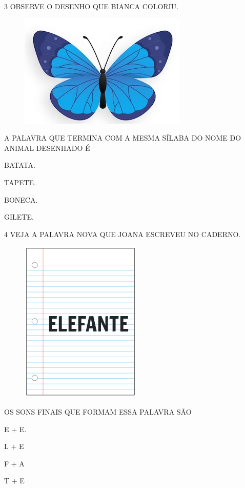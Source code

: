\num{3} OBSERVE O DESENHO QUE BIANCA COLORIU.

\begin{figure}[H]
\centering
\includegraphics[width=.45\textwidth]{media/image227.png}
\end{figure}


A PALAVRA QUE TERMINA COM A MESMA SÍLABA DO NOME DO ANIMAL DESENHADO É

\begin{escolha}
\item BATATA.

\item TAPETE.

\item BONECA.

\item GILETE.
\end{escolha}


\num{4} VEJA A PALAVRA NOVA QUE JOANA ESCREVEU NO CADERNO.

\begin{figure}[H]
\centering
\includegraphics[width=.25\textwidth]{media/image230.png}
\end{figure}

OS SONS FINAIS QUE FORMAM ESSA PALAVRA SÃO

\begin{multicols}{4}
\begin{escolha}
\item E + E.

\item L + E

\item F + A

\item T + E
\end{escolha}
\end{multicols}

